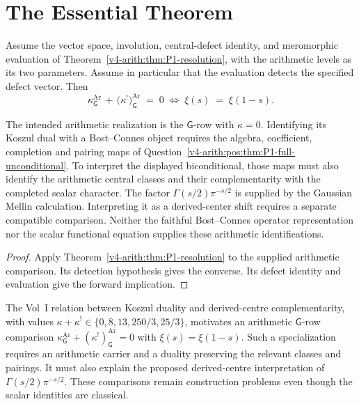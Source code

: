 \section{The Essential Theorem}
\label{v4-arith:syn:load-bearing}

\begin{theorem}[\(\mathsf{G}\)-row arithmetic complementarity = Riemann functional equation]
\label{v4-arith:thm:G-row-Riemann-functional-equation}
Assume the vector space, involution, central-defect identity, and
meromorphic evaluation of Theorem~\ref{v4-arith:thm:P1-resolution},
with the arithmetic levels as its two parameters. Assume in particular
that the evaluation detects the specified defect vector. Then
\begin{equation}
\boxed{\;\kappa^{\mathrm{Ar}}_{\mathsf{G}}\,+\,\bigl(\kappa^{!}\bigr)^{\mathrm{Ar}}_{\mathsf{G}}\;=\;0\;\Longleftrightarrow\;\xi(s)\;=\;\xi(1-s).\;}
\end{equation}

The intended arithmetic realization is the \(\mathsf G\)-row with
\(\kappa=0\). Identifying its Koszul dual with a Bost--Connes object
requires the algebra, coefficient, completion and pairing maps of
Question~\ref{v4-arith:pos:thm:P1-full-unconditional}. To interpret the displayed
biconditional, those maps must also identify the arithmetic central
classes and their complementarity with the completed scalar character.
The factor \(\Gamma(s/2)\pi^{-s/2}\) is supplied by the Gaussian Mellin
calculation. Interpreting it as a derived-center shift requires a
separate compatible comparison. Neither the faithful Bost--Connes
operator representation nor the scalar functional equation supplies
these arithmetic identifications.
\end{theorem}
\begin{proof}
Apply Theorem~\ref{v4-arith:thm:P1-resolution} to the supplied
arithmetic comparison. Its detection hypothesis gives the converse.
Its defect identity and evaluation give the forward implication.
\end{proof}

\begin{remark}
The Vol~I relation between Koszul duality and derived-centre
complementarity, with values
\(\kappa+\kappa^!\in\{0,8,13,250/3,25/3\}\), motivates an
arithmetic \(\mathsf G\)-row comparison
\(\kappa^{\mathrm{Ar}}_{\mathsf G}+(\kappa^!)^{\mathrm{Ar}}_{\mathsf G}=0\)
with \(\xi(s)=\xi(1-s)\). Such a specialization requires an arithmetic
carrier and a duality preserving the relevant classes and pairings.
It must also explain the proposed derived-centre interpretation of
\(\Gamma(s/2)\pi^{-s/2}\). These comparisons remain construction
problems even though the scalar identities are classical.
\end{remark}

